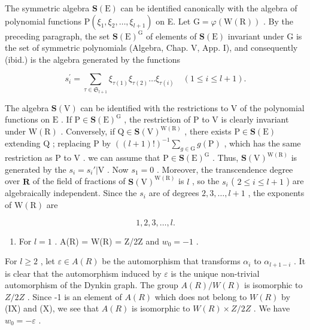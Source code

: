 The symmetric algebra \(\mathbf{S}(\mathrm{E})\) can be identified canonically with the algebra of polynomial functions \(\mathrm{P}(\xi_1, \xi_2, \ldots, \xi_{l+1})\) on E. Let \(\mathrm{G} = \varphi(\mathrm{W}(\mathrm{R}))\) . By the preceding paragraph, the set \(\mathbf{S}(\mathrm{E})^{\mathrm{G}}\) of elements of \(\mathbf{S}(\mathrm{E})\) invariant under G is the set of symmetric polynomials (Algebra, Chap. V, App. I), and consequently (ibid.) is the algebra generated by the functions

\[
s _ {i} ^ {\prime} = \sum_ {\tau \in \mathfrak {S} _ {l + 1}} \xi_ {\tau (1)} \xi_ {\tau (2)} \dots \xi_ {\tau (i)} \quad (1 \leqslant i \leqslant l + 1).
\]

The algebra \(\mathbf{S}(\mathrm{V})\) can be identified with the restrictions to \(\mathrm{V}\) of the polynomial functions on \(\mathrm{E}\) . If \(\mathrm{P} \in \mathbf{S}(\mathrm{E})^{\mathrm{G}}\) , the restriction of \(\mathrm{P}\) to \(\mathrm{V}\) is clearly invariant under \(\mathrm{W}(\mathrm{R})\) . Conversely, if \(\mathrm{Q} \in \mathbf{S}(\mathrm{V})^{\mathrm{W}(\mathrm{R})}\) , there exists \(\mathrm{P} \in \mathbf{S}(\mathrm{E})\) extending \(\mathrm{Q}\) ; replacing \(\mathrm{P}\) by \(((l + 1)!)^{-1} \sum_{g \in \mathrm{G}} g(\mathrm{P})\) , which has the same restriction as \(\mathrm{P}\) to \(\mathrm{V}\) . we can assume that \(\mathrm{P} \in \mathbf{S}(\mathrm{E})^{\mathrm{G}}\) . Thus, \(\mathbf{S}(\mathrm{V})^{\mathrm{W}(\mathrm{R})}\) is generated by the \(s_i = s_i'|\mathrm{V}\) . Now \(s_1 = 0\) . Moreover, the transcendence degree over \(\mathbf{R}\) of the field of fractions of \(\mathbf{S}(\mathrm{V})^{\mathrm{W}(\mathrm{R})}\) is \(l\) , so the \(s_i\) ( \(2 \leqslant i \leqslant l + 1\) ) are algebraically independent. Since the \(s_i\) are of degrees \(2, 3, \ldots, l + 1\) , the exponents of \(\mathrm{W}(\mathrm{R})\) are

\[
1, 2, 3, \dots , l.
\]

\begin{enumerate}
\def\labelenumi{(\Roman{enumi})}
\setcounter{enumi}{10}
\tightlist
\item
  For \(l = 1\) . A(R) = W(R) = Z/2Z and \(w_0 = -1\) .
\end{enumerate}

For \(l \geqslant 2\) , let \(\varepsilon \in A(R)\) be the automorphism that transforms \(\alpha_i\) to \(\alpha_{l+1-i}\) . It is clear that the automorphism induced by \(\varepsilon\) is the unique non-trivial automorphism of the Dynkin graph. The group \(A(R)/W(R)\) is isomorphic to \(Z/2Z\) . Since -1 is an element of \(A(R)\) which does not belong to \(W(R)\) by (IX) and (X), we see that \(A(R)\) is isomorphic to \(W(R) \times Z/2Z\) . We have \(w_0 = -\varepsilon\) .

